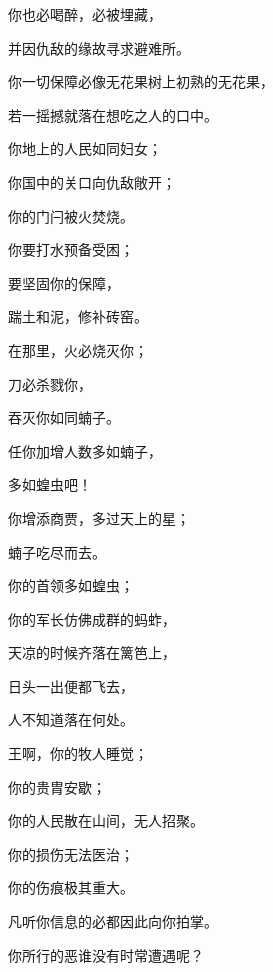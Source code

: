 {\par }{\BB \par }{\Q {}你也必喝醉，必被埋藏，
\par }{\Q 并因仇敌的缘故寻求避难所。
\par }{\Q {}你一切保障必像无花果树上初熟的无花果，
\par }{\Q 若一摇撼就落在想吃之人的口中。
\par }{\Q {}你地上的人民如同妇女；
\par }{\Q 你国中的关口向仇敌敞开；
\par }{\Q 你的门闩被火焚烧。
\par }{\BB \par }{\Q {}你要打水预备受困；
\par }{\Q 要坚固你的保障，
\par }{\Q 踹土和泥，修补砖窑。
\par }{\Q {}在那里，火必烧灭你；
\par }{\Q 刀必杀戮你，
\par }{\Q 吞灭你如同蝻子。
\par }{\BB \par }{\Q 任你加增人数多如蝻子，
\par }{\Q 多如蝗虫吧！
\par }{\Q {}你增添商贾，多过天上的星；
\par }{\Q 蝻子吃尽而去。
\par }{\Q {}你的首领多如蝗虫；
\par }{\Q 你的军长仿佛成群的蚂蚱，
\par }{\Q 天凉的时候齐落在篱笆上，
\par }{\Q 日头一出便都飞去，
\par }{\Q 人不知道落在何处。
\par }{\BB \par }{\Q {}王啊，你的牧人睡觉；
\par }{\Q 你的贵胄安歇；
\par }{\Q 你的人民散在山间，无人招聚。
\par }{\Q {}你的损伤无法医治；
\par }{\Q 你的伤痕极其重大。
\par }{\Q 凡听你信息的必都因此向你拍掌。
\par }{\Q 你所行的恶谁没有时常遭遇呢？
\par }